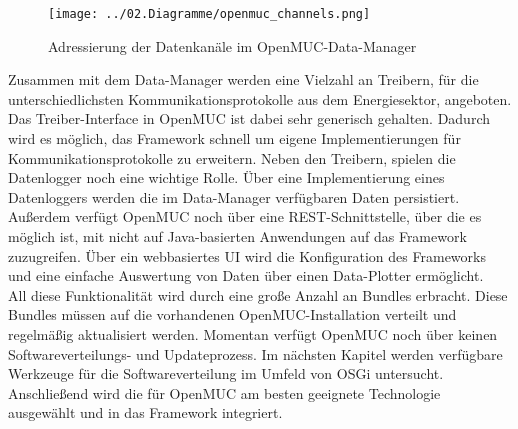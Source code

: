\begin{figure}[h]
 \centering
 \texttt{[image: ../02.Diagramme/openmuc\_channels.png]}
 \caption{Adressierung der Datenkanäle im OpenMUC-Data-Manager}
 \label{fig:openmuc_channels}
\end{figure}

Zusammen mit dem Data-Manager werden eine Vielzahl an Treibern, für die unterschiedlichsten Kommunikationsprotokolle aus dem Energiesektor, angeboten.
Das Treiber-Interface in OpenMUC ist dabei sehr generisch gehalten. Dadurch wird es möglich, das Framework schnell um eigene Implementierungen für Kommunikationsprotokolle
zu erweitern. Neben den Treibern, spielen die Datenlogger noch eine wichtige Rolle. Über eine Implementierung eines Datenloggers werden die im Data-Manager verfügbaren Daten persistiert.
Außerdem verfügt OpenMUC noch über eine \ac{REST}-Schnittstelle, über die es möglich ist, mit nicht auf Java-basierten Anwendungen auf das Framework zuzugreifen. Über ein 
webbasiertes \ac{UI} wird die Konfiguration des Frameworks und eine einfache Auswertung von Daten über einen Data-Plotter ermöglicht.\\

All diese Funktionalität wird durch eine große Anzahl an Bundles erbracht. Diese Bundles müssen auf die vorhandenen OpenMUC-Installation verteilt und regelmäßig aktualisiert werden. 
Momentan verfügt OpenMUC noch über keinen Softwarevertei\-lungs- und Updateprozess. Im nächsten Kapitel werden verfügbare Werkzeuge für die Softwareverteilung im Umfeld von OSGi untersucht.
Anschließend wird die für OpenMUC am besten geeignete Technologie ausgewählt und in das Framework integriert. 
